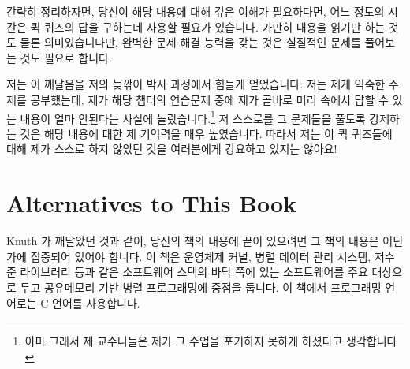 간략히 정리하자면, 당신이 해당 내용에 대해 깊은 이해가 필요하다면, 어느 정도의
시간은 퀵 퀴즈의 답을 구하는데 사용할 필요가 있습니다.
가만히 내용을 읽기만 하는 것도 물론 의미있습니다만, 완벽한 문제 해결 능력을
갖는 것은 실질적인 문제를 풀어보는 것도 필요로 합니다.


저는 이 깨달음을 저의 늦깎이 박사 과정에서 힘들게 얻었습니다.  저는 제게 익숙한
주제를 공부했는데, 제가 해당 챕터의 연습문제 중에 제가 곧바로 머리 속에서 답할
수 있는 내용이 얼마 안된다는 사실에 놀랐습니다.\footnote{ 아마 그래서 제
교수니들은 제가 그 수업을 포기하지 못하게 하셨다고 생각합니다} 저 스스로를 그
문제들을 풀도록 강제하는 것은 해당 내용에 대한 제 기억력을 매우 높였습니다.
따라서 저는 이 퀵 퀴즈들에 대해 제가 스스로 하지 않았던 것을 여러분에게
강요하고 있지는 않아요!


\section{Alternatives to This Book}
\label{sec:Alternatives to This Book}

Knuth 가 깨달았던 것과 같이, 당신의 책의 내용에 끝이 있으려면 그 책의 내용은
어딘가에 집중되어 있어야 합니다.  이 책은 운영체제 커널, 병렬 데이터 관리
시스템, 저수준 라이브러리 등과 같은 소프트웨어 스택의 바닥 쪽에 있는
소프트웨어를 주요 대상으로 두고 공유메모리 기반 병렬 프로그래밍에 중점을
둡니다.
이 책에서 프로그래밍 언어로는 C 언어를 사용합니다.


